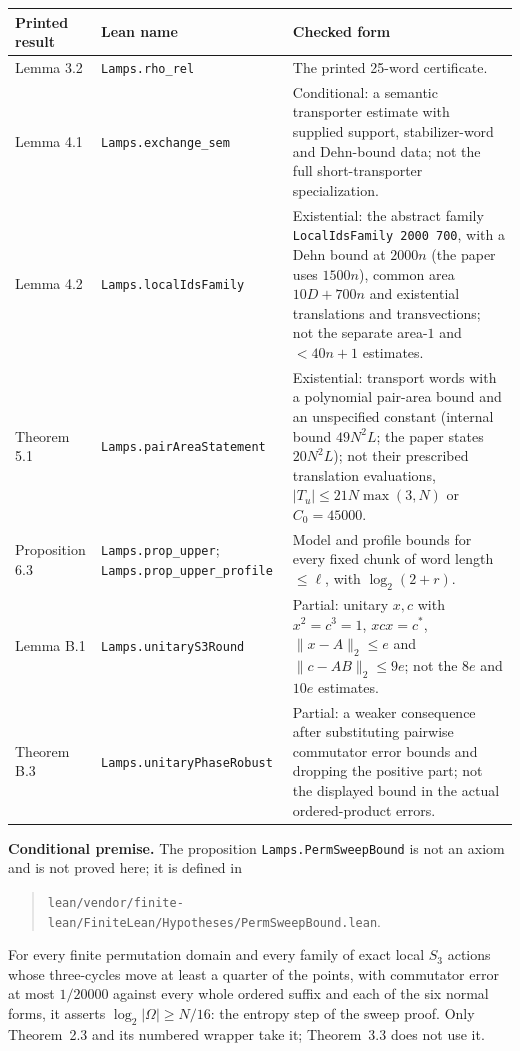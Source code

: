 \begin{center}\footnotesize
\begin{minipage}{\linewidth}
\setlength{\tabcolsep}{4pt}
\begin{tabular}{@{}>{\raggedright\arraybackslash}p{.15\linewidth}>{\raggedright\arraybackslash}p{.30\linewidth}>{\raggedright\arraybackslash}p{.49\linewidth}@{}}
\toprule Printed result & Lean name & Checked form\\\midrule
Lemma 3.2 & \nolinkurl{Lamps.rho_rel} & The printed 25-word certificate.\\[4pt]
Lemma 4.1 & \nolinkurl{Lamps.exchange_sem} & Conditional: a semantic transporter estimate with supplied support, stabilizer-word and Dehn-bound data; not the full short-transporter specialization.\\[4pt]
Lemma 4.2 & \nolinkurl{Lamps.localIdsFamily} & Existential: the abstract family \texttt{LocalIdsFamily 2000 700}, with a Dehn bound at $2000n$ (the paper uses $1500n$), common area $10D+700n$ and existential translations and transvections; not the separate area-$1$ and ${<}40n+1$ estimates.\\[4pt]
Theorem 5.1 & \nolinkurl{Lamps.pairAreaStatement} & Existential: transport words with a polynomial pair-area bound and an unspecified constant (internal bound $49N^2L$; the paper states $20N^2L$); not their prescribed translation evaluations, $|T_u|\le21N\max(3,N)$ or $C_0=45000$.\\[4pt]
Proposition 6.3 & \nolinkurl{Lamps.prop_upper}; \nolinkurl{Lamps.prop_upper_profile} & Model and profile bounds for every fixed chunk of word length $\le\ell$, with $\log_2(2+r)$.\\[4pt]
Lemma B.1 & \nolinkurl{Lamps.unitaryS3Round} & Partial: unitary $x,c$ with $x^2=c^3=1$, $xcx=c^*$, $\|x-A\|_2\le e$ and $\|c-AB\|_2\le9e$; not the $8e$ and $10e$ estimates.\\[4pt]
Theorem B.3 & \nolinkurl{Lamps.unitaryPhaseRobust} & Partial: a weaker consequence after substituting pairwise commutator error bounds and dropping the positive part; not the displayed bound in the actual ordered-product errors.\\
\bottomrule
\end{tabular}\end{minipage}\end{center}

\noindent\textbf{Conditional premise.} The proposition
\nolinkurl{Lamps.PermSweepBound} is not an axiom and is not proved here; it is
defined in
\begin{quote}\small
\nolinkurl{lean/vendor/finite-lean/FiniteLean/Hypotheses/PermSweepBound.lean}.
\end{quote}
For every finite
permutation domain and every family of exact local $S_3$ actions whose
three-cycles move at least a quarter of the points, with commutator error at
most $1/20000$ against every whole ordered suffix and each of the six normal
forms, it asserts $\log_2|\Omega|\ge N/16$: the entropy step of the sweep
proof. Only Theorem~2.3 and its numbered wrapper take it; Theorem~3.3 does
not use it.

